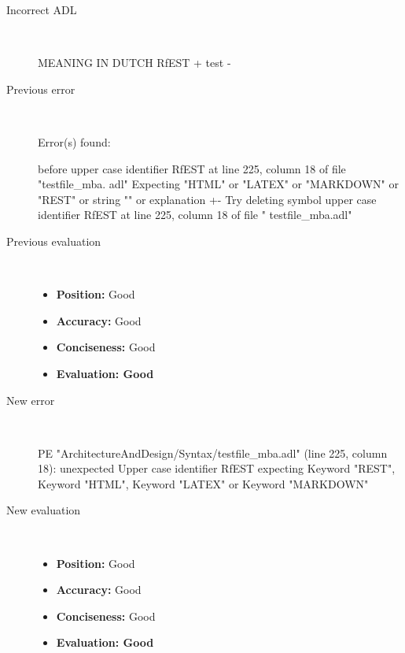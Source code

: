\begin{description}
  \item[Incorrect ADL]~\\
\begin{adl}
MEANING IN DUTCH RfEST {+ test -}\end{adl}
  \item[Previous error]~\\
\begin{haskell}
Error(s) found:

before upper case identifier RfEST at line 225, column 18 of file "testfile_mba.
adl"
Expecting "HTML" or "LATEX" or "MARKDOWN" or "REST" or string "" or explanation
{+-}
Try deleting symbol upper case identifier RfEST at line 225, column 18 of file "
testfile_mba.adl"\end{haskell}
  \item[Previous evaluation]~\\
    \begin{itemize}
    \item \textbf{Position:} Good
    \item \textbf{Accuracy:} Good
    \item \textbf{Conciseness:} Good
    \item \textbf{Evaluation: Good}
    \end{itemize}
  \item[New error]~\\
\begin{haskell}
PE "ArchitectureAndDesign/Syntax/testfile_mba.adl" (line 225, column 18):
unexpected Upper case identifier RfEST
expecting Keyword "REST", Keyword "HTML", Keyword "LATEX" or Keyword "MARKDOWN"
\end{haskell}
  \item[New evaluation]~\\
    \begin{itemize}
    \item \textbf{Position:} Good
    \item \textbf{Accuracy:} Good
    \item \textbf{Conciseness:} Good
    \item \textbf{Evaluation: Good}
    \end{itemize}
  \end{description}

\hrulefill

